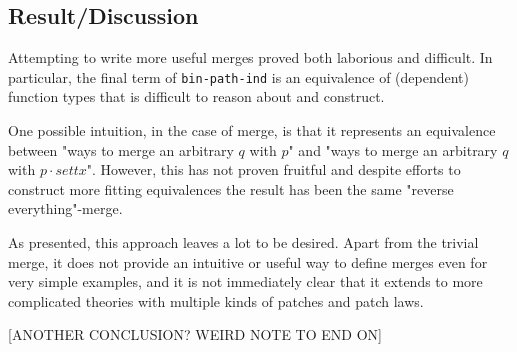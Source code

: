 \subsection{Result/Discussion}
Attempting to write more useful merges proved both laborious and difficult. In
particular, the final term of \texttt{bin-path-ind} is an equivalence of
(dependent) function types that is difficult to reason about and construct.

One possible intuition, in the case of merge, is that it represents an equivalence between
"ways to merge an arbitrary $q$ with $p$" and "ways to merge an arbitrary $q$ with $p \cdot sett x$".
However, this has not proven fruitful and despite efforts to construct more fitting equivalences
the result has been the same "reverse everything"-merge.

As presented, this approach leaves a lot to be desired. Apart from the trivial
merge, it does not provide an intuitive or useful way to define merges even for
very simple examples, and it is not immediately clear that it
extends to more complicated theories with multiple kinds of patches and patch
laws.

[ANOTHER CONCLUSION? WEIRD NOTE TO END ON]
